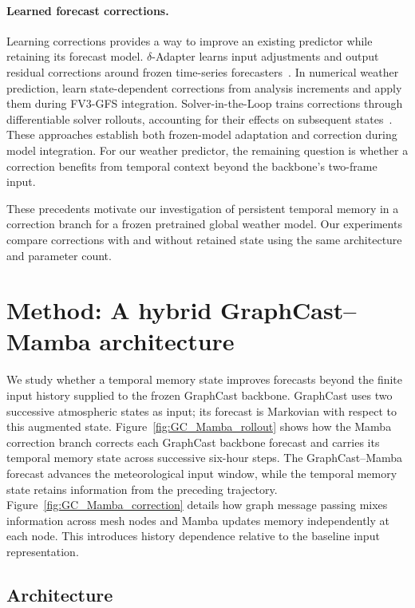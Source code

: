 \documentclass{article}
\begin{document}
\paragraph{Learned forecast corrections.}
Learning corrections provides a way to improve an existing predictor while retaining its forecast model. $\delta$-Adapter learns input adjustments and output residual corrections around frozen time-series forecasters~\citep{liang2026forecast}. In numerical weather prediction, \citet{chen2022correcting} learn state-dependent corrections from analysis increments and apply them during FV3-GFS integration. Solver-in-the-Loop trains corrections through differentiable solver rollouts, accounting for their effects on subsequent states~\citep{um2020solver}. These approaches establish both frozen-model adaptation and correction during model integration. For our weather predictor, the remaining question is whether a correction benefits from temporal context beyond the backbone's two-frame input.

These precedents motivate our investigation of persistent temporal memory in a correction branch for a frozen pretrained global weather model. Our experiments compare corrections with and without retained state using the same architecture and parameter count.
\par
\endgroup


\section{Method: A hybrid GraphCast--Mamba architecture}


We study whether {a temporal memory state improves forecasts beyond the finite input history supplied to the frozen GraphCast backbone}. GraphCast uses two successive atmospheric states as input; its forecast is Markovian with respect to this augmented state. Figure~\ref{fig:GC_Mamba_rollout} shows {how the Mamba correction branch corrects each GraphCast backbone forecast and carries its temporal memory state across successive six-hour steps. The GraphCast--Mamba forecast advances the meteorological input window, while the temporal memory state retains information from the preceding trajectory.} Figure~\ref{fig:GC_Mamba_correction} details how graph message passing mixes information across mesh nodes and Mamba updates memory independently at each node. This introduces history dependence relative to the baseline input representation.

\subsection{{Architecture}}
\end{document}
